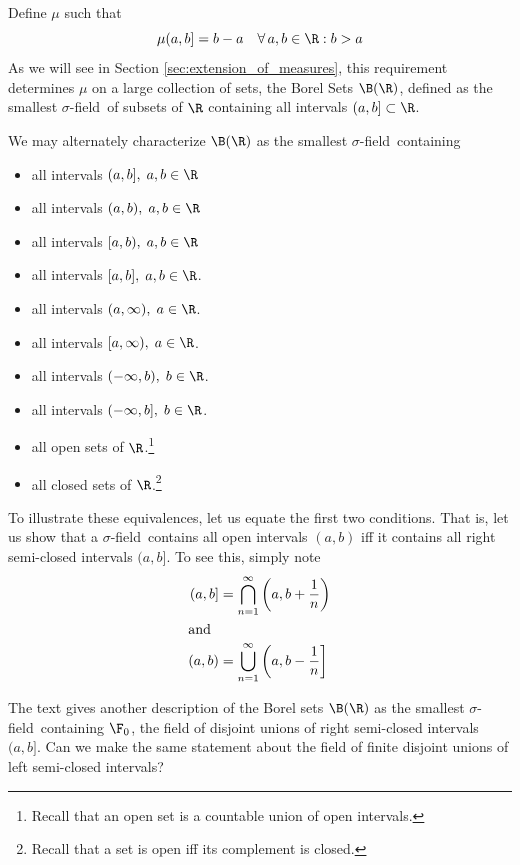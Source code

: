 \documentclass{article} %
\renewcommand{\sf}{$\sigma$-field}
\begin{document}
\begin{example}{}
Define $\mu$ such that 
\[ \mu(a,b] = b-a \quad \forall \, a,b \in \R : b>a \]
As we will see in Section \ref{sec:extension_of_measures}, this requirement determines $\mu$ on a large collection of sets, the Borel Sets $\B(\R)$, defined as the smallest \sf\ of subsets of $\R$ containing all intervals $(a,b] \subset \R$.

We may alternately characterize $\B(\R)$ as the smallest \sf\ containing
\begin{itemize}
\item all intervals $(a,b], \; a,b \in \R$
\item all intervals $(a,b), \; a,b \in \R$
\item all intervals $[a,b), \; a,b \in \R$
\item all intervals $[a,b], \; a,b \in \R$.
\item all intervals $(a,\infty), \; a \in \R$.
\item  all intervals $[a,\infty), \; a \in \R$.
\item 	 all intervals $(-\infty,b), \; b \in \R$.
\item  all intervals $(-\infty,b], \; b \in \R$.
\item all open sets of $\R$.\footnote{Recall that an open set is a countable union of open intervals.}
\item all closed sets of $\R$.\footnote{Recall that a set is open iff its complement is closed.}
\end{itemize}

To illustrate these equivalences, let us equate the first two conditions. That is, let us show that a \sf\ contains all open intervals $(a,b)$ iff it contains all right semi-closed intervals $(a,b]$.  To see this, simply note
\begin{subequations}
\begin{align}
(a,b] &= \bigcap_{n=1}^\infty \bigg(a, b+\frac{1}{n}\bigg) \\
	\intertext{and}
(a,b) &= \bigcup_{n=1}^\infty \bigg(a, b-\frac{1}{n}\bigg] 
\end{align}
\end{subequations}
\label{eqn:open_intervals_as_rsc_intervals_and_vice_versa}
\label{ex:lesbesgue_measure}
\end{example}

\begin{question}
The text gives another description of the Borel sets $\B(\R)$ as the smallest \sf\ containing $\F_0$, the field of disjoint unions of right semi-closed intervals $(a,b]$.  Can we make the same statement about the field of finite disjoint unions of left semi-closed intervals?
\end{question}
\end{document}
